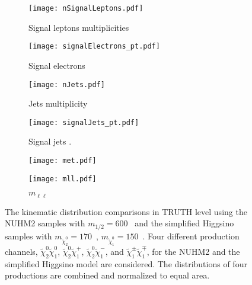 \begin{figure}[htbp]
    \begin{center}
        \begin{subfigure}[b]{0.48\textwidth}
            \texttt{[image: nSignalLeptons.pdf]}
            \caption{Signal leptons multiplicities}
        \end{subfigure}
        \begin{subfigure}[b]{0.48\textwidth}
            \texttt{[image: signalElectrons\_pt.pdf]}
            \caption{Signal electrons \pt}
        \end{subfigure}
        \begin{subfigure}[b]{0.48\textwidth}
            \texttt{[image: nJets.pdf]}
            \caption{Jets multiplicity}
        \end{subfigure}
        \begin{subfigure}[b]{0.48\textwidth}
            \texttt{[image: signalJets\_pt.pdf]}
            \caption{Signal jets \pt.}
        \end{subfigure}
        \begin{subfigure}[b]{0.48\textwidth}
            \texttt{[image: met.pdf]}
            \caption{\met}
        \end{subfigure}
        \begin{subfigure}[b]{0.48\textwidth}
            \texttt{[image: mll.pdf]}
            \caption{$m_{\ell\ell}$}
        \end{subfigure}
    \end{center}
    \caption{The kinematic distribution comparisons in TRUTH level using the NUHM2 samples with $m_{1/2} = 600$~{\GeV} and the simplified Higgsino samples with $m_{\widetilde{\chi}^{0}_{2}} = 170$~{\GeV}, $m_{\widetilde{\chi}^{0}_{1}} = 150$~{\GeV}.
    Four different production channels, $\widetilde{\chi}^{0}_{2}\widetilde{\chi}^{0}_{1}$, $\widetilde{\chi}^{0}_{2}\widetilde{\chi}^{+}_{1}$, $\widetilde{\chi}^{0}_{2}\widetilde{\chi}^{-}_{1}$, and $\widetilde{\chi}^{\pm}_{1}\widetilde{\chi}^{\mp}_{1}$, for the NUHM2 and the simplified Higgsino model are considered.
    The distributions of four productions are combined and normalized to equal area.}
    \label{fig:results_kinematic_distribution_comparisons}
\end{figure}

